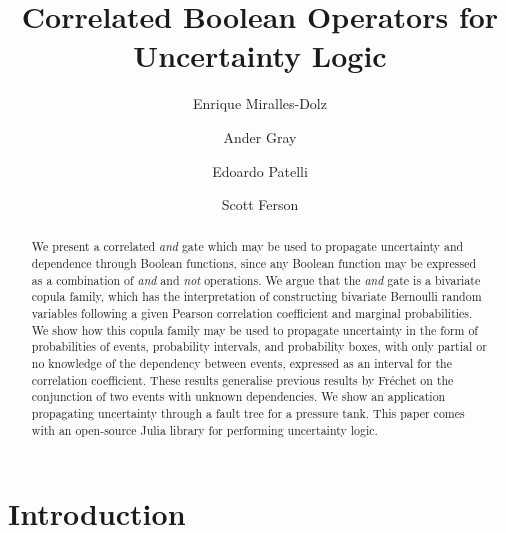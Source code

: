 \documentclass[runningheads]{llncs}
\begin{document}
%
\title{Correlated Boolean Operators for Uncertainty Logic}
%
%
\author{Enrique Miralles-Dolz \and 
Ander Gray \and
Edoardo Patelli \and
Scott Ferson}
%
%
%
\maketitle              %
%
\begin{abstract}

We present a correlated \textit{and} gate which may be used to propagate uncertainty and dependence through Boolean functions, since any Boolean function may be expressed as a combination of \textit{and} and \textit{not} operations.
We argue that the \textit{and} gate is a bivariate copula family, which has the interpretation of constructing bivariate Bernoulli random variables following a given Pearson correlation coefficient and marginal probabilities. We show how this copula family may be used to propagate uncertainty in the form of probabilities of events, probability intervals, and probability boxes, with only partial or no knowledge of the dependency between events, expressed as an interval for the correlation coefficient. These results generalise previous results by Fréchet on the conjunction of two events with unknown dependencies. We show an application propagating uncertainty through a fault tree for a pressure tank. This paper comes with an open-source Julia library for performing uncertainty logic.

\end{abstract}
%
%
%
\section{Introduction}
\end{document}
